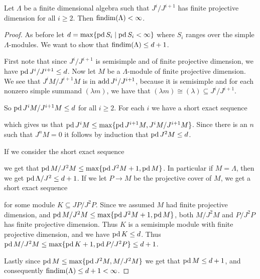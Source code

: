 \begin{theorem}\cite[Theorem~3.1]{Moc65}
	Let $\Lambda$ be a finite dimensional algebra such that $J^i/J^{i+1}$ has finite projective dimension for all $i \geq 2$. Then $\operatorname{findim}(\Lambda) < \infty$.
	\begin{proof}
		As before let $d = \max\{\operatorname{pd} S_i \mid \operatorname{pd} S_i < \infty\}$ where $S_i$ ranges over the simple $\Lambda$-modules. We want to show that $\operatorname{findim}(\Lambda) \leq d+1$.

		First note that since $J^i/J^{i+1}$ is semisimple and of finite projective dimension, we have $\operatorname{pd} J^i/J^{i+1} \leq d$. Now let $M$ be a $\Lambda$-module of finite projective dimension. We see that $J^iM/J^{i+1}M$ is in $\operatorname{add} J^i/J^{i+1}$, because it is semisimple and for each nonzero simple summand $(\lambda m)$, we have that $(\lambda m) \cong (\lambda) \subseteq J^i/J^{i+1}$.

		So $\operatorname{pd} J^iM/J^{i+1}M \leq d$ for all $i\geq 2$. For each $i$ we have a short exact sequence
		\begin{center}
		\end{center}
		which gives us that $\operatorname{pd} J^i M \leq \max\{ \operatorname{pd} J^{i+1}M, J^iM/J^{i+1}M \}$. Since there is an $n$ such that $J^n M = 0$ it follows by induction that $\operatorname{pd} J^2M \leq d$.

		If we consider the short exact sequence
		\begin{center}
		\end{center}
		we get that $\operatorname{pd} M/J^2M \leq \max\{\operatorname{pd} J^2M+1, \operatorname{pd} M\}$. In particular if $M=\Lambda$, then we get $\operatorname{pd} \Lambda/J^2 \leq d+1$. If we let $P \to M$ be the projective cover of $M$, we get a short exact sequence
		\begin{center}
		\end{center}
		for some module $K \subseteq JP/J^2P$. Since we assumed $M$ had finite projective dimension, and $\operatorname{pd} M/J^2M \leq \max\{\operatorname{pd} J^2M+1, \operatorname{pd} M\}$, both $M/J^2M$ and $P/J^2P$ has finite projective dimension. Thus $K$ is a semisimple module with finite projective dimension, and we have $\operatorname{pd} K \leq d$. Thus $\operatorname{pd} M/J^2M \leq \max\{\operatorname{pd} K + 1, \operatorname{pd} P/J^2P\} \leq d+1$.

		Lastly since $\operatorname{pd} M \leq \max\{\operatorname{pd} J^2M, M/J^2M\}$ we get that $\operatorname{pd} M \leq d+1$, and consequently $\operatorname{findim}(\Lambda) \leq d+1 < \infty$.
	\end{proof}
\end{theorem}

